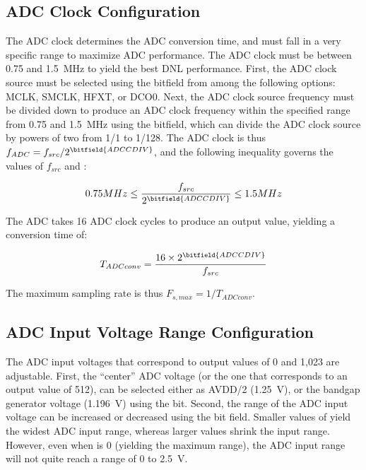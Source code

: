 \subsection{ADC Clock Configuration}

The ADC clock determines the ADC conversion time, and must fall in a very specific range to maximize ADC performance. The ADC clock must be between 0.75 and 1.5~\si{\mega\hertz} to yield the best DNL performance. First, the ADC clock source must be selected using the  bitfield from among the following options: MCLK, SMCLK, HFXT, or DCO0. Next, the ADC clock source frequency must be divided down to produce an ADC clock frequency within the specified range from 0.75 and 1.5~\si{\mega\hertz} using the  bitfield, which can divide the ADC clock source by powers of two from 1/1 to 1/128. The ADC clock is thus $f_{ADC} = f_{src}/2^\bitfield{ADCCDIV}$, and the following inequality governs the values of $f_{src}$ and :

\begin{equation*}
	0.75 MHz \leq \frac{f_{src}}{2^\bitfield{ADCCDIV}} \leq 1.5 MHz
\end{equation*}

The ADC takes 16 ADC clock cycles to produce an output value, yielding a conversion time of:

\begin{equation*}
	T_{ADC conv} = \frac{16 \times 2^\bitfield{ADCCDIV}}{f_{src}}
\end{equation*}

The maximum sampling rate is thus $F_{s,max} = 1/T_{ADC conv}$.



\subsection{ADC Input Voltage Range Configuration}

The ADC input voltages that correspond to output values of 0 and 1,023 are adjustable. First, the ``center'' ADC voltage (or the one that corresponds to an output value of 512), can be selected either as AVDD/2 (1.25~\si{\volt}), or the bandgap generator voltage (1.196~\si{\volt}) using the  bit. Second, the range of the ADC input voltage can be increased or decreased using the  bit field. Smaller values of  yield the widest ADC input range, whereas larger values shrink the input range. However, even when  is 0 (yielding the maximum range), the ADC input range will not quite reach a range of 0 to 2.5~\si{\volt}.

